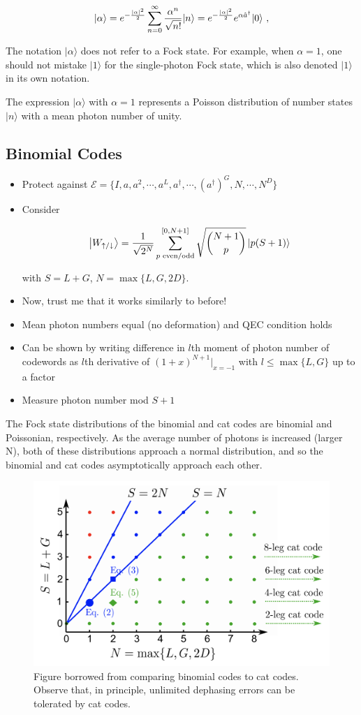 \documentclass[12]{amsart}
\newcommand\0{\mathbf{0}}
\newcommand\<{\langle}
\renewcommand\>{\rangle}
\begin{document}
$$
|\alpha\rangle =e^{-{|\alpha|^2\over2}}\sum_{n=0}^{\infty}{\alpha^n\over\sqrt{n!}}|n\rangle =e^{-{|\alpha|^2\over2}}e^{\alpha\hat a^\dagger}|0\rangle ~,
$$

The notation ${\displaystyle |\alpha \rangle }$  does not refer to a Fock state. For example, when $\alpha = 1$, one should not mistake ${\displaystyle |1\rangle }$ for the single-photon Fock state, which is also denoted ${\displaystyle |1\rangle } $  in its own notation. 

The expression ${\displaystyle |\alpha \rangle } $  with $\alpha = 1$ represents a Poisson distribution of number states ${\displaystyle |n\rangle }$  with a mean photon number of unity.

\subsection{Binomial Codes}

\begin{itemize}
\item Protect against $\mathcal{E} = \{I, a, a^2, \cdots, a^L, a^\dag, \cdots, (a^\dag)^G, N, \cdots, N^D \}$
\item Consider

$$
\ket{W_{\uparrow / \downarrow}} = \frac{1}{\sqrt{2^N}} \sum_{ p\text{ even/odd}}^{[0, N+1]} \sqrt{\binom{N+1}{ p }} \ket{p(S+1)}
$$

with $S = L+G$, $N = \max\{L, G, 2D\}$.

\item Now, trust me that it works similarly to before!
\item Mean photon numbers equal (no deformation) and QEC condition holds
\item Can be shown by writing difference in $l$th moment of photon number of codewords as $l$th derivative of $(1+x)^{N+1}\vert_{x=-1}$ with $l \leq \max\{L, G\}$ up to a factor
\item Measure photon number mod $S+1$
\end{itemize}

The Fock state distributions of the binomial and cat codes are binomial and Poissonian, respectively. As the average number of photons is increased (larger N), both of these distributions approach a normal distribution, and so the binomial and cat codes asymptotically approach each other. 

\begin{figure}[H]
\centering
\includegraphics[width=0.5\linewidth,keepaspectratio]{binom_cat.png}	
\caption{Figure borrowed from \cite{michael2016new} comparing binomial codes to cat codes. Observe that, in principle, unlimited dephasing errors can be tolerated by cat codes.}
\end{figure}
\end{document}
